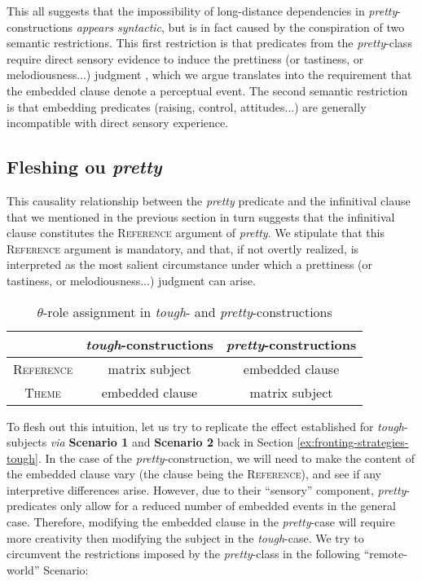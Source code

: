 \documentclass[11pt]{article}
\begin{document}
This all suggests that the impossibility of long-distance dependencies in \textit{pretty}-constructions \textit{appears syntactic}, but is in fact caused by the conspiration of two semantic restrictions. This first restriction is that predicates from the \textit{pretty}-class require direct sensory evidence to induce the prettiness (or tastiness, or melodiousness...) judgment \cite{Pearson2012,Hirvonen2016}, which we argue translates into the requirement that the embedded clause denote a perceptual event. The second semantic restriction is that embedding predicates (raising, control, attitudes...) are generally incompatible with direct sensory experience.


\subsection{Fleshing ou \textit{pretty}}


This causality relationship between the \textit{pretty} predicate and the infinitival clause that we mentioned in the previous section in turn suggests that the infinitival clause constitutes the \textsc{Reference} argument of \textit{pretty}. We stipulate that this \textsc{Reference} argument is mandatory, and that, if not overtly realized, is interpreted as the most salient circumstance under which a prettiness (or tastiness, or melodiousness...) judgment can arise.

\begin{table}[H]
	\centering
	\begin{tabular}{|c|c|c|}
		\hline
		& \textit{tough}-constructions & \textit{pretty}-constructions\\ 
		\hline
		\textsc{Reference} & matrix subject & embedded clause \\
		\textsc{Theme} & embedded clause & matrix subject \\ \hline
	\end{tabular}
	\caption{$\theta$-role assignment in \textit{tough}- and \textit{pretty}-constructions}
\end{table}


To flesh out this intuition, let us try to replicate the effect established for \textit{tough}-subjects \textit{via} \textbf{Scenario 1} and \textbf{Scenario 2} back in Section \ref{ex:fronting-strategies-tough}. In the case of the \textit{pretty}-construction, we will need to make the content of the embedded clause vary (the clause being the \textsc{Reference}), and see if any interpretive differences arise. However, due to their ``sensory'' component, \textit{pretty}-predicates only allow for a reduced number of embedded events in the general case. Therefore, modifying the embedded clause in the \textit{pretty}-case will require more creativity then modifying the subject in the \textit{tough}-case. We try to circumvent the restrictions imposed by the \textit{pretty}-class in the following ``remote-world'' Scenario:
\end{document}
